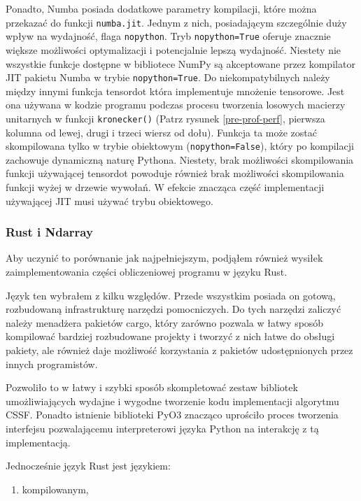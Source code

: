 \documentclass[11pt, a4paper]{article}
\newcommand{\code}[1]{\texttt{#1}}
\begin{document}
\begin{sloppypar}
    Ponadto, Numba posiada dodatkowe parametry kompilacji, które można przekazać do
    funkcji \code{numba.jit}. Jednym z nich, posiadającym szczególnie duży wpływ na wydajność,
    flaga \code{nopython}. Tryb \code{nopython=True} oferuje znacznie większe możliwości
    optymalizacji i potencjalnie lepszą wydajność. Niestety nie wszystkie funkcje
    dostępne w bibliotece NumPy są akceptowane przez kompilator JIT pakietu Numba w
    trybie \code{nopython=True}. Do niekompatybilnych należy między innymi funkcja
    tensordot która implementuje mnożenie tensorowe. Jest ona używana w kodzie programu podczas
    procesu tworzenia losowych macierzy unitarnych w funkcji \code{kronecker()} (Patrz rysunek
    \ref{pre-prof-perf}, pierwsza kolumna od lewej, drugi i trzeci wiersz od dołu). Funkcja
    ta może zostać skompilowana tylko w trybie obiektowym (\code{nopython=False}), który
    po kompilacji zachowuje dynamiczną naturę Pythona. Niestety, brak możliwości skompilowania
    funkcji używającej tensordot powoduje również brak możliwości skompilowania funkcji wyżej
    w drzewie wywołań. W efekcie znacząca część implementacji używającej JIT musi używać
    trybu obiektowego.

    \subsubsection{Rust i Ndarray}
    Aby uczynić to porównanie jak najpełniejszym, podjąłem również wysiłek zaimplementowania
    części obliczeniowej programu w języku Rust.

    Język ten wybrałem z kilku względów. Przede wszystkim posiada on gotową, rozbudowaną
    infrastrukturę narzędzi pomocniczych. Do tych narzędzi zaliczyć należy menadżera
    pakietów cargo, który zarówno pozwala w łatwy sposób kompilować bardziej rozbudowane
    projekty i tworzyć z nich łatwe do obsługi pakiety, ale również daje możliwość
    korzystania z pakietów udostępnionych przez innych programistów.

    Pozwoliło to w łatwy i szybki sposób skompletować zestaw bibliotek umożliwiających
    wydajne i wygodne tworzenie kodu implementacji algorytmu CSSF. Ponadto istnienie biblioteki
    PyO3 znacząco uprościło proces tworzenia interfejsu pozwalającemu interpreterowi języka
    Python na interakcję z tą implementacją.

    Jednocześnie język Rust jest językiem:
    \begin{enumerate}
      \item kompilowanym,


\end{enumerate}
\end{sloppypar}
\end{document}
